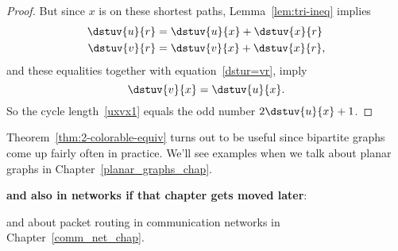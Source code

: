 \begin{editingnotes}
\begin{proof}
But since $x$ is on these shortest paths, Lemma~\ref{lem:tri-ineq} implies
\begin{align*}
\dstuv{u}{r} & = \dstuv{u}{x} + \dstuv{x}{r}\\
\dstuv{v}{r} & = \dstuv{v}{x} + \dstuv{x}{r},
\end{align*}
and these equalities together with equation~\eqref{dstur=vr},
imply
\[
\dstuv{v}{x} = \dstuv{u}{x}.
\]
So the cycle length~\ref{uxvx1} equals the odd number $2\dstuv{u}{x}+1$.
\end{proof}

\end{editingnotes}

Theorem~\ref{thm:2-colorable-equiv} turns out to be useful since bipartite
graphs come up fairly often in practice.  We'll see examples when we talk
about planar graphs in Chapter~\ref{planar_graphs_chap}. 

\begin{editingnotes}
\textbf{and also in networks if that chapter gets moved later}:

and about packet routing in communication networks
in Chapter~\ref{comm_net_chap}.

\end{editingnotes}


